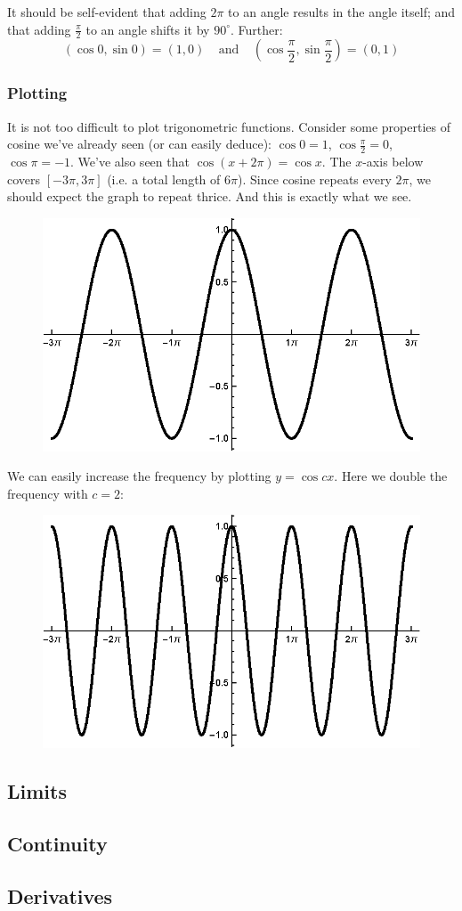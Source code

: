 \vs

It should be self-evident that adding $2\pi$ to an angle results in the
angle itself; and that adding $\frac{\pi}{2}$ to an angle shifts it by
$90^{\circ}$. Further:
\[(\cos 0,\sin 0)=(1,0)\ \ \ \ \ \text{and}\ \ \ \ \ (\cos \frac{\pi}{2},\sin \frac{\pi}{2})=(0,1)\]

\clearpage
\subsubsection*{Plotting}
It is not too difficult to plot trigonometric functions. Consider some
properties of cosine we've already seen (or can easily deduce):
$\cos 0=1$, $\cos \frac{\pi}{2}=0$, $\cos \pi=-1$. We've also seen that
$\cos{(x+2\pi)}=\cos x$. The $x$-axis below covers $[-3\pi, 3\pi]$ (i.e. a
total length of $6\pi$). Since cosine repeats every $2\pi$, we should
expect the graph to repeat thrice. And this is exactly what we see.
\begin{figure}[htbp]
  \centering
  \includegraphics[width=.75\textwidth]{eps/prereqs/cosine.eps}
\end{figure}

We can easily increase the frequency by plotting $y=\cos cx$. Here we
double the frequency with $c=2$:
\begin{figure}[htbp]
  \centering
  \includegraphics[width=.75\textwidth]{eps/prereqs/cosine2x.eps}
\end{figure}

\clearpage
\subsection{Limits}
\subsection{Continuity}
\subsection{Derivatives}

